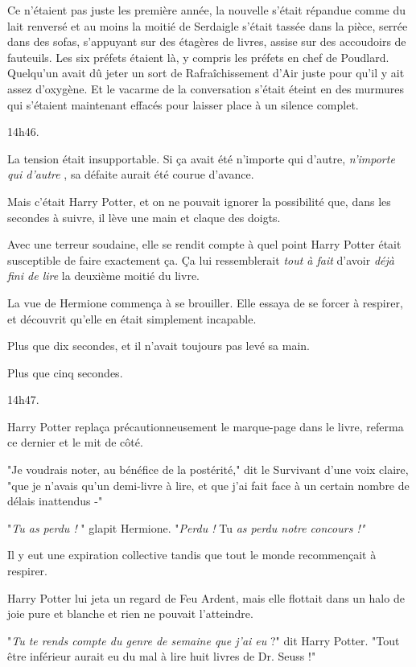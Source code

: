Ce n'étaient pas juste les première année, la nouvelle s'était répandue comme du lait renversé et au moins la moitié de Serdaigle s'était tassée dans la pièce, serrée dans des sofas, s'appuyant sur des étagères de livres, assise sur des accoudoirs de fauteuils. Les six préfets étaient là, y compris les préfets en chef de Poudlard. Quelqu'un avait dû jeter un sort de Rafraîchissement d'Air juste pour qu'il y ait assez d'oxygène. Et le vacarme de la conversation s'était éteint en des murmures qui s'étaient maintenant effacés pour laisser place à un silence complet.

14h46.

La tension était insupportable. Si ça avait été n'importe qui d'autre, \emph{n'importe qui d'autre} , sa défaite aurait été courue d'avance.

Mais c'était Harry Potter, et on ne pouvait ignorer la possibilité que, dans les secondes à suivre, il lève une main et claque des doigts.

Avec une terreur soudaine, elle se rendit compte à quel point Harry Potter était susceptible de faire exactement ça. Ça lui ressemblerait \emph{tout à fait}  d'avoir \emph{déjà fini de lire}  la deuxième moitié du livre.

La vue de Hermione commença à se brouiller. Elle essaya de se forcer à respirer, et découvrit qu'elle en était simplement incapable.

Plus que dix secondes, et il n'avait toujours pas levé sa main.

Plus que cinq secondes.

14h47.

Harry Potter replaça précautionneusement le marque-page dans le livre, referma ce dernier et le mit de côté.

"Je voudrais noter, au bénéfice de la postérité," dit le Survivant d'une voix claire, "que je n'avais qu'un demi-livre à lire, et que j'ai fait face à un certain nombre de délais inattendus -"

"\emph{Tu as perdu !} " glapit Hermione. "\emph{Perdu ! } Tu\emph{ as perdu notre concours !"} 

Il y eut une expiration collective tandis que tout le monde recommençait à respirer.

Harry Potter lui jeta un regard de Feu Ardent, mais elle flottait dans un halo de joie pure et blanche et rien ne pouvait l'atteindre.

"\emph{Tu te rends compte du genre de semaine que j'ai eu } ?" dit Harry Potter. "Tout être inférieur aurait eu du mal à lire huit livres de Dr. Seuss !"

